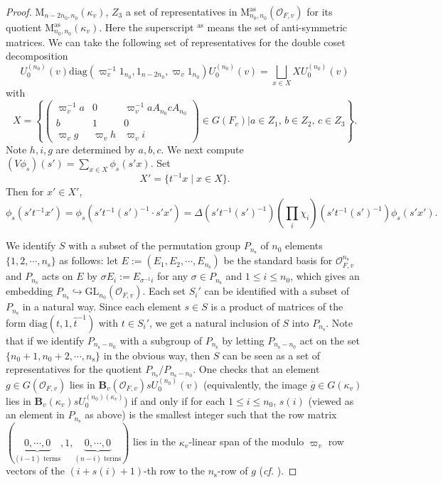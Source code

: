 \documentclass[12pt,oneside,reqno]{amsart}
\theoremstyle{plain}
\begin{document}
\begin{proof}
		$\mathrm{M}_{n-2n_0,n_0}(\kappa_v)$, $Z_3$
		a set of representatives in
		$\mathrm{M}_{n_0,n_0}^\mathrm{as}(\mathcal{O}_{F,v})$
		for its quotient
		$\mathrm{M}_{n_0,n_0}^\mathrm{as}(\kappa_v)$.
		Here
		the superscript
		$^\mathrm{as}$
		means the set of anti-symmetric matrices.
		We can take the following set of representatives for
		the double coset
		decomposition
		\[
		U_0^{(n_0)}(v)
		\mathrm{diag}(\varpi_v^{-1}1_{n_0},1_{n-2n_0},\varpi_v1_{n_0})
		U_0^{(n_0)}(v)
		=
		\bigsqcup_{x\in X}XU_0^{(n_0)}(v)
		\]
		with
		\[
		X=
		\left\{
		\begin{pmatrix}
			\varpi_v^{-1}a & 0 & \varpi_v^{-1}aA_{n_0}cA_{n_0}
			\\
			b & 1 & 0
			\\
			\varpi_v g & \varpi_v h & \varpi_v i 
		\end{pmatrix}\in G(F_v)
		\bigg|
		a\in Z_1,\,
		b\in Z_2,\,
		c\in Z_3
		\right\}.
		\]
		Note $h,i,g$ are determined by $a,b,c$.
		We next compute
		$(V\phi_s)(s')=
		\sum_{x\in X}
		\phi_s(s'x)$.
		Set
		\[
		X'=\{t^{-1}x\mid x\in X\}.
		\]
		Then for
		$x'\in X'$,
		\[
		\phi_s(s't^{-1}x')
		=
		\phi_s(s't^{-1}(s')^{-1}\cdot s'x')
		=
		\Delta(s't^{-1}(s')^{-1})
		(\prod_i\chi_i)(s't^{-1}(s')^{-1})
		\phi_s(s'x').
		\]
		
		
		
		
		
		We identify $S$ with a subset of the permutation group $P_{n_\mathrm{s}}$
		of $n_0$ elements $\{1,2,\cdots,n_\mathrm{s}\}$ as follows:	let
		$E:=(E_1,E_2,\cdots,E_{n_\mathrm{s}})$ be the standard basis for
		$\mathcal{O}_{F,v}^{n_\mathrm{s}}$ and $P_{n_\mathrm{s}}$ acts on $E$ by
		$\sigma E_i:=E_{\sigma^{-1}i}$ for any $\sigma\in P_{n_\mathrm{s}}$ and $1\leq i\leq n_0$, which gives an embedding $P_{n_\mathrm{s}}	\hookrightarrow\mathrm{GL}_{n_0}(\mathcal{O}_{F,v})$. Each set $S_i'$ can be identified with a subset of $P_{n_\mathrm{s}}$ in a natural way.	Since each element $s\in S$ is a product of matrices of the form $\mathrm{diag}(t,1,\hat{t}^{-1})$ with $t\in S_i'$, we get a natural inclusion of
		$S$ into $P_{n_\mathrm{s}}$. Note that if we identify $P_{n_\mathrm{s}-n_0}$ with a subgroup of $P_{n_\mathrm{s}}$
		by letting $P_{n_\mathrm{s}-n_0}$ act on the set $\{n_0+1,n_0+2,\cdots,n_\mathrm{s}\}$ in the obvious way,
		then $S$ can be seen as a set of representatives for the quotient
		$P_{n_\mathrm{s}}/P_{n_\mathrm{s}-n_0}$. One checks that an element
		$g\in G(\mathcal{O}_{F,v})$ lies in $\mathbf{B}_v(\mathcal{O}_{F,v})sU_0^{(n_0)}(v)$ (equivalently,
		the image $\overline{g}\in G(\kappa_v)$ lies in $\mathbf{B}_v(\kappa_v)sU_0^{(n_0)(\kappa_v)}$)	if and only if
		for each $1\leq i\leq n_0$, $s(i)$ (viewed as an element in $P_{n_\mathrm{s}}$ as above) is the smallest integer such that the row matrix $(\underbrace{0,\cdots,0}_\text{$(i-1)$ terms},1,\underbrace{0,\cdots,0}_\text{$(n-i)$ terms})$ lies in the	$\kappa_v$-linear span of the modulo $\varpi_v$ row vectors of the
		$(i+s(i)+1)$-th row to the $n_\mathrm{s}$-row of $g$ (\emph{cf.} \cite[p.85]{ClozelHarrisTaylor2008}).
		

\end{proof}
\end{document}

